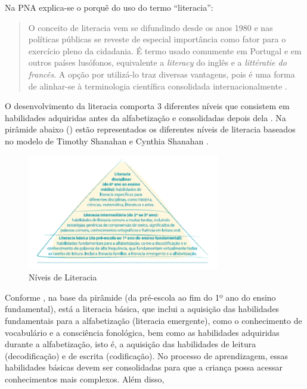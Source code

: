 \documentclass{textolivre}
\begin{document}
Na PNA explica-se o porquê do uso do termo “literacia”:

\begin{quote}
O conceito de literacia vem se difundindo desde os anos 1980 e nas políticas públicas se reveste de especial importância como fator para o exercício pleno da cidadania. É termo usado comumente em Portugal e em outros países lusófonos, equivalente a \emph{literacy} do inglês e a \emph{littératie do francês}. A opção por utilizá-lo traz diversas vantagens, pois é uma forma de alinhar-se à terminologia científica consolidada internacionalmente \cite[p. 21]{brasil2019}.
\end{quote}

O desenvolvimento da literacia comporta 3 diferentes níveis que consistem em habilidades adquiridas antes da alfabetização e consolidadas depois dela \cite[p. 21]{brasil2019}. Na pirâmide abaixo () estão representados os diferentes níveis de literacia baseados no modelo de Timothy Shanahan e Cynthia Shanahan \cite{shanahan2008}.

\begin{figure}[htbp]
 \centering
 \includegraphics[width=0.75\textwidth]{fig.png}
 \caption{Níveis de Literacia}
 \label{fig1}
\end{figure}

Conforme \textcite[p. 43-44]{shanahan2008}, na base da pirâmide (da pré-escola ao fim do 1º ano do ensino fundamental), está a literacia básica, que inclui a aquisição das habilidades fundamentais para a alfabetização (literacia emergente), como o conhecimento de vocabulário e a consciência fonológica, bem como as habilidades adquiridas durante a alfabetização, isto é, a aquisição das habilidades de leitura (decodificação) e de escrita (codificação). No processo de aprendizagem, essas habilidades básicas devem ser consolidadas para que a criança possa acessar conhecimentos mais complexos. Além disso, 
\end{document}
